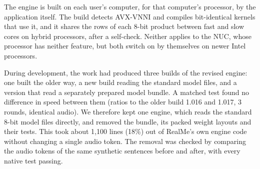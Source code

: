 \documentclass[11pt]{article}
\begin{document}
The engine is built on each user's computer, for that computer's
processor, by the application itself. The build detects AVX-VNNI and
compiles bit-identical kernels that use it, and it shares the rows of
each 8-bit product between fast and slow cores on hybrid processors,
after a self-check. Neither applies to the NUC, whose processor has
neither feature, but both switch on by themselves on newer Intel
processors.

During development, the work had produced three builds of the revised
engine: one built the older way, a new build reading the standard model
files, and a version that read a separately prepared model bundle. A
matched test found no difference in speed between them (ratios to the
older build 1.016 and 1.017, 3 rounds, identical audio). We therefore
kept one engine, which reads the standard 8-bit model files directly,
and removed the bundle, its packed weight layouts and their tests. This
took about 1,100 lines (18\%) out of RealMe's own engine code without
changing a single audio token. The removal was checked by comparing the
audio tokens of the same synthetic sentences before and after, with
every native test passing.
\end{document}
